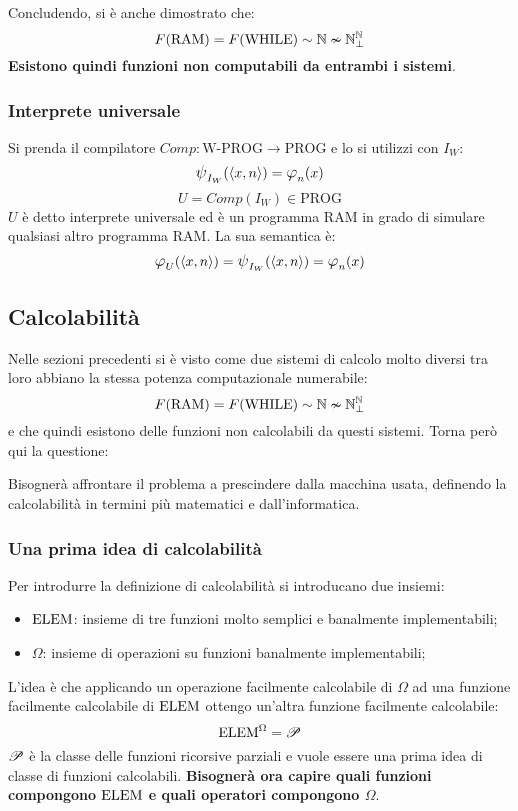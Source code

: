 Concludendo, si è anche dimostrato che:
$$ F(\text{RAM})=F(\text{WHILE}) \sim \mathbb{N} \nsim \mathbb{N}^{\mathbb{N}}_\perp $$
\textbf{Esistono quindi funzioni non computabili da entrambi i sistemi}.

\subsubsection{Interprete universale}\label{sec:interpreteU}
Si prenda il compilatore $Comp:\text{W-PROG}\to\text{PROG}$ e lo si utilizzi con $I_W$:
$$ \semanticaWHILE_{I_W}(\cantor{x,n})=\semanticaRAM_n(x) $$
$$ U = Comp(I_W)\in\text{PROG} $$
$U$ è detto interprete universale ed è un programma RAM in grado di simulare qualsiasi
altro programma RAM.
La sua semantica è:
$$ \semanticaRAM_U(\cantor{x,n})=\semanticaWHILE_{I_W}(\cantor{x,n})=\semanticaRAM_n(x) $$

\subsection{Calcolabilità}
Nelle sezioni precedenti si è visto come due sistemi di calcolo molto diversi tra loro 
abbiano la stessa potenza computazionale numerabile:
$$ F(\text{RAM}) = F(\text{WHILE}) \sim \mathbb{N} \nsim \mathbb{N}^{\mathbb{N}}_\perp$$
e che quindi esistono delle funzioni non calcolabili da questi sistemi. Torna però qui la
questione: 

Bisognerà affrontare il problema a prescindere dalla macchina usata, definendo la 
calcolabilità in termini più matematici e  dall'informatica.

\subsubsection{Una prima idea di calcolabilità}
Per introdurre la definizione  di calcolabilità si introducano due insiemi:
\begin{itemize}
    \item $\text{ELEM}$: insieme di tre funzioni molto semplici e banalmente implementabili;
    \item $\Omega$: insieme di operazioni su funzioni banalmente implementabili;
\end{itemize}

L'idea è che applicando un operazione facilmente calcolabile di $\Omega$ ad una funzione
facilmente calcolabile di $\text{ELEM}$ ottengo un'altra funzione facilmente calcolabile:
$$ \text{ELEM}^\Omega = \mathscr{P} $$
$\mathscr{P}$ è la classe delle funzioni ricorsive parziali e vuole essere una prima 
idea di classe di funzioni calcolabili. \textbf{Bisognerà ora capire quali funzioni compongono 
$\text{ELEM}$ e quali operatori compongono $\Omega$}.

